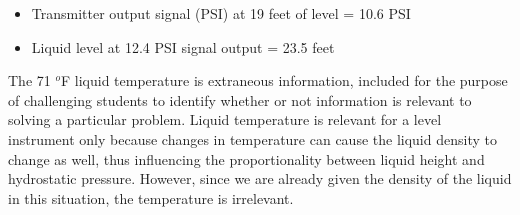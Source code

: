 \begin{itemize}
\item{} Transmitter output signal (PSI) at 19 feet of level = 10.6 PSI
\item{} Liquid level at 12.4 PSI signal output = 23.5 feet
\end{itemize}

\vskip 10pt

The 71 $^{o}$F liquid temperature is extraneous information, included for the purpose of challenging students to identify whether or not information is relevant to solving a particular problem.  Liquid temperature is relevant for a level instrument only because changes in temperature can cause the liquid density to change as well, thus influencing the proportionality between liquid height and hydrostatic pressure.  However, since we are already given the density of the liquid in this situation, the temperature is irrelevant.










